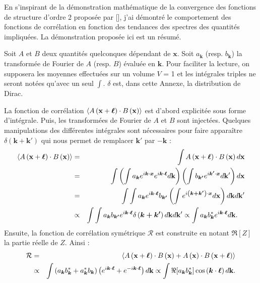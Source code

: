  
 En s'inspirant de la démonstration mathématique de la convergence des fonctions de structure d'ordre 2 proposée par [\cite{cho_simulations_2009}], j'ai démontré le comportement des fonctions de corrélation en fonction des tendances des spectres des quantités impliquées. La démonstration proposée ici est un résumé. 

 Soit $A$ et $B$ deux quantités quelconques dépendant de $\mathbf{x}$.
 Soit $a_{\boldsymbol{k}}$ (resp. $b_{\boldsymbol{k}}$) la transformée de Fourier de $A$ (resp. $B$) évaluée en  $\boldsymbol{k}$. Pour faciliter la lecture, on supposera les moyennes effectuées sur un volume $V$ = 1 et les intégrales triples ne seront notées qu'avec un seul $\int$. $\delta$ est, dans cette Annexe, la distribution de Dirac. 

La fonction de corrélation $\left<A\left({\bf x} + \boldsymbol{\ell}\right)  \cdot B\left({\bf x}\right)\right>$ est d'abord explicitée sous forme d'intégrale. Puis, les transformées de Fourier de $A$ et $B$ sont injectées. Quelques manipulations des différentes intégrales sont nécessaires pour faire apparaître $\delta\left(\boldsymbol{k+k'}\right)$ qui nous permet de remplacer $\boldsymbol{k'}$ par $-\boldsymbol{k}$ : 
 \begin{eqnarray}
 \left<A\left({\bf x} + \boldsymbol{\ell}\right)  \cdot B\left({\bf x}\right)\right> &=& \int A\left({\bf x} + \boldsymbol{\ell}\right) \cdot B\left({\bf x}\right) d{\bf x} \\
 &=& \int \left(\int a_{\boldsymbol{k}} e^{i\boldsymbol{k}\cdot\boldsymbol{x}} e^{i\boldsymbol{k}\cdot\boldsymbol{\ell}} d{\bf k} \right)\left(\int b_{\boldsymbol{k'}} e^{i\boldsymbol{k'}\cdot\boldsymbol{x}} d{\bf k'}\right) d{\bf x}  \\ 
 &=& \int \int a_{\boldsymbol{k}}  e^{i\boldsymbol{k}\cdot\boldsymbol{\ell}}  b_{\boldsymbol{k'}}  \left(\int e^{i\left(\boldsymbol{k+k'}\right)\cdot\boldsymbol{x}}d{\bf x}\right)d{\bf k}d{\bf k'} \\
 &\propto& \int \int a_{\boldsymbol{k}} b_{\boldsymbol{k'}} e^{i\boldsymbol{k}\cdot\boldsymbol{\ell}}    \delta\left(\boldsymbol{k+k'}\right) d{\bf k}d{\bf k'}\propto \int a_{\boldsymbol{k}}  b^*_{\boldsymbol{k}} e^{i\boldsymbol{k}\cdot\boldsymbol{\ell}}  d{\bf k} .\quad
 \end{eqnarray}
 Ensuite, la fonction de corrélation symétrique $\mathcal{R}$ est construite en notant $\Re[Z]$ la partie réelle de $Z$. Ainsi : 
 \begin{eqnarray}
 \mathcal{R} &=& \left<A\left({\bf x} + \boldsymbol{\ell}\right)  \cdot B\left({\bf x}\right) + A\left({\bf x}\right)  \cdot B\left({\bf x} + \boldsymbol{\ell}\right)\right> \\
 &\propto& \int \left(a_{\boldsymbol{k}}  b^*_{\boldsymbol{k}} + a^*_{\boldsymbol{k}}  b_{\boldsymbol{k}}\right) \left(e^{i\boldsymbol{k}\cdot\boldsymbol{\ell}} + e^{-i\boldsymbol{k}\cdot\boldsymbol{\ell}}\right)  d{\bf k} \propto \int \Re[a_{\boldsymbol{k}}  b^*_{\boldsymbol{k}}] \cos\left(\boldsymbol{k}\cdot\boldsymbol{\ell}\right) d{\bf k}.
 \end{eqnarray}
 
